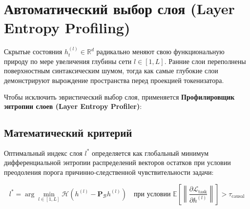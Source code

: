 \documentclass[11pt,a4paper]{article}
\begin{document}
\section{Автоматический выбор слоя (Layer Entropy Profiling)}

Скрытые состояния $h_t^{(l)} \in \mathbb{R}^d$ радикально меняют свою функциональную природу по мере увеличения глубины сети $l \in [1, L]$. Ранние слои переполнены поверхностным синтаксическим шумом, тогда как самые глубокие слои демонстрируют вырождение пространства перед проекцией токенизатора.

Чтобы исключить эвристический выбор слоя, применяется \textbf{Профилировщик энтропии слоев (Layer Entropy Profiler)}:

\begin{figure}[h!]
\centering
{}
\end{figure}

\subsection*{Математический критерий}
Оптимальный индекс слоя $l^*$ определяется как глобальный минимум дифференциальной энтропии распределений векторов остатков при условии преодоления порога причинно-следственной чувствительности задачи:

\begin{equation}
l^* = \arg\min_{l \in [1, L]} \mathcal{H}\left( h^{(l)} - \mathbf{P}_{\mathcal{B}} h^{(l)} \right) \quad \text{при условии } \mathbb{E}\left[ \left\| \frac{\partial \mathcal{L}_{\text{task}}}{\partial h^{(l)}} \right\| \right] > \tau_{\text{causal}}
\end{equation}
\end{document}
